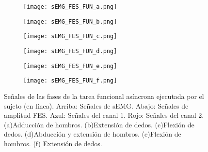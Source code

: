 \begin{figure}[htbp]
	\centering
	\begin{subfigure}[htbp]{0.35\textwidth}
		\texttt{[image: sEMG\_FES\_FUN\_a.png]}
		\caption{}
		\label{Figura: Fun_Sen_A}
	\end{subfigure}
	\hspace*{1cm}
	\begin{subfigure}[htbp]{0.35\textwidth}
		\texttt{[image: sEMG\_FES\_FUN\_b.png]}
		\caption{}
		\label{Figura: Fun_Sen_B}
	\end{subfigure}
	\newline
	\begin{subfigure}[htbp]{0.35\textwidth}
		\texttt{[image: sEMG\_FES\_FUN\_c.png]}
		\caption{}
		\label{Figura: Fun_Sen_C}
	\end{subfigure}
	\hspace*{1cm}
	\begin{subfigure}[htbp]{0.35\textwidth}
		\texttt{[image: sEMG\_FES\_FUN\_d.png]}
		\caption{}
		\label{Figura: Fun_Sen_D}
	\end{subfigure}
	\newline
	\begin{subfigure}[htbp]{0.35\textwidth}
		\texttt{[image: sEMG\_FES\_FUN\_e.png]}
		\caption{}
		\label{Figura: Fun_Sen_E}
	\end{subfigure}
	\hspace*{1cm}
	\begin{subfigure}[htbp]{0.35\textwidth}
		\texttt{[image: sEMG\_FES\_FUN\_f.png]}
		\caption{}
		\label{Figura: Fun_F}
	\end{subfigure}
	\caption[Señales de las fases de la tarea funcional asíncrona ejecutada por el sujeto (en línea)]{Señales de las fases de la tarea funcional asíncrona ejecutada por el sujeto (en línea). Arriba: Señales de sEMG. Abajo: Señales de amplitud FES. Azul: Señales del canal 1. Rojo: Señales del canal 2. (a)Adducción de hombros. (b)Extensión de dedos. (c)Flexión de dedos. (d)Abducción y extensión de hombros. (e)Flexión de hombros. (f) Extensión de dedos.}
	\label{Figura: TareaFuncional_Senales}
\end{figure}

